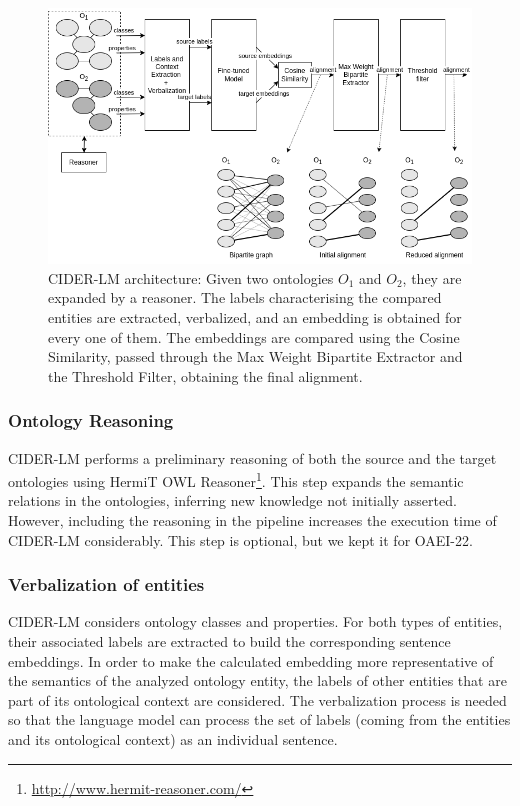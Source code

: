\documentclass[
]{ceurart}
\begin{document}
\begin{figure}
  \centering
  \includegraphics[width=\linewidth]{cider-lm-architecture-3.drawio.png}
  \caption{CIDER-LM architecture: Given two ontologies $O_1$ and $O_2$, they are expanded by a reasoner. The labels characterising the compared entities are extracted, verbalized, and an embedding is obtained for every one of them. The embeddings are compared using the Cosine Similarity, passed through the Max Weight Bipartite Extractor and the Threshold Filter, obtaining the final alignment.}
  \label{fig:architecture}
\end{figure}


\subsubsection{Ontology Reasoning}

CIDER-LM performs a preliminary reasoning of both the source and the target ontologies using HermiT OWL Reasoner\footnote{\url{http://www.hermit-reasoner.com/}}. This step expands the semantic relations in the ontologies, inferring new knowledge not initially asserted. However, including the reasoning in the pipeline increases the execution time of CIDER-LM considerably. This step is optional, but we kept it for OAEI-22.  

\subsubsection{Verbalization of entities}
CIDER-LM considers ontology classes and properties. For both types of entities, their associated labels are extracted to build the corresponding sentence embeddings. 
In order to make the calculated embedding more representative of the semantics of the analyzed ontology entity, the labels of other entities that are part of its ontological context are considered. The verbalization process is needed so that the language model can process the set of labels (coming from the entities and its ontological context) as an individual sentence.
\end{document}
